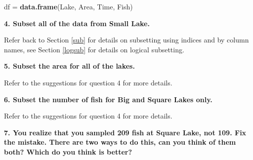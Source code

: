 \documentclass[]{book}
\newenvironment{Shaded}{\begin{snugshade}}{\end{snugshade}}
\newcommand{\CommentTok}[1]{\textcolor[rgb]{0.56,0.35,0.01}{\textit{#1}}}
\newcommand{\DecValTok}[1]{\textcolor[rgb]{0.00,0.00,0.81}{#1}}
\newcommand{\KeywordTok}[1]{\textcolor[rgb]{0.13,0.29,0.53}{\textbf{#1}}}
\newcommand{\NormalTok}[1]{#1}
\newcommand{\OperatorTok}[1]{\textcolor[rgb]{0.81,0.36,0.00}{\textbf{#1}}}
\newcommand{\StringTok}[1]{\textcolor[rgb]{0.31,0.60,0.02}{#1}}
\begin{document}
\begin{Shaded}
\begin{Highlighting}[]
\NormalTok{df =}\StringTok{ }\KeywordTok{data.frame}\NormalTok{(Lake, Area, Time, Fish)}
\end{Highlighting}
\end{Shaded}

\textbf{4. Subset all of the data from Small Lake.}

Refer back to Section \ref{sub} for details on subsetting using indices and by column names, see Section \ref{logsub} for details on logical subsetting.

\begin{Shaded}
\end{Shaded}

\textbf{5. Subset the area for all of the lakes.}

Refer to the suggestions for question 4 for more details.

\begin{Shaded}
\end{Shaded}

\textbf{6. Subset the number of fish for Big and Square Lakes only.}

Refer to the suggestions for question 4 for more details.

\begin{Shaded}
\end{Shaded}

\textbf{7. You realize that you sampled 209 fish at Square Lake, not 109. Fix the mistake. There are two ways to do this, can you think of them both? Which do you think is better?}
\end{document}
